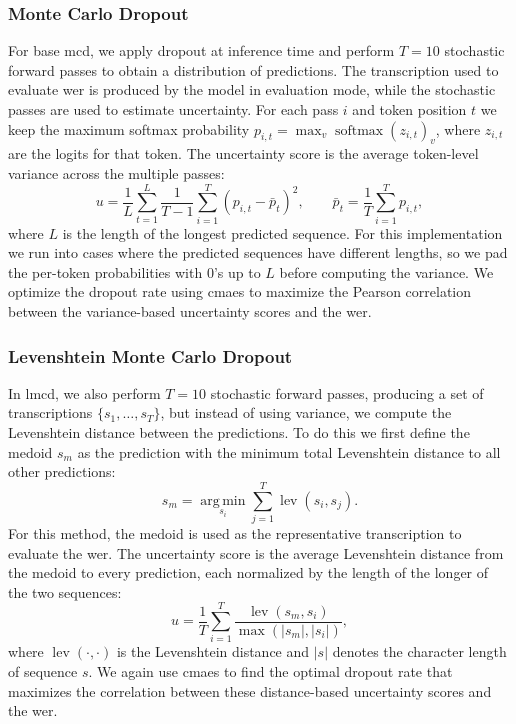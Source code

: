 \subsubsection{Monte Carlo Dropout}
For base \acrshort{mcd}, we apply dropout at inference time and perform $T = 10$ stochastic forward passes to obtain a distribution of predictions. The transcription used to evaluate \acrshort{wer} is produced by the model in evaluation mode, while the stochastic passes are used to estimate uncertainty. For each pass $i$ and token position $t$ we keep the maximum softmax probability $p_{i,t} = \max_v \operatorname{softmax}(z_{i,t})_v$, where $z_{i,t}$ are the logits for that token. The uncertainty score is the average token-level variance across the multiple passes:
\begin{equation}
	u = \frac{1}{L}\sum_{t=1}^{L} \frac{1}{T-1}\sum_{i=1}^{T}\left(p_{i,t} - \bar{p}_t\right)^2,
	\qquad \bar{p}_t = \frac{1}{T}\sum_{i=1}^{T} p_{i,t},
\end{equation}
where $L$ is the length of the longest predicted sequence.
For this implementation we run into cases where the predicted sequences have different lengths, so we pad the per-token probabilities with 0's up to $L$ before computing the variance.
We optimize the dropout rate using \acrshort{cmaes} to maximize the Pearson correlation between the variance-based uncertainty scores and the \acrshort{wer}.

\subsubsection{Levenshtein Monte Carlo Dropout}
In \acrshort{lmcd}, we also perform $T = 10$ stochastic forward passes, producing a set of transcriptions $\{s_1, \dots, s_T\}$, but instead of using variance, we compute the Levenshtein distance \cite{levenshtein1966binary} between the predictions. To do this we first define the medoid $s_m$ as the prediction with the minimum total Levenshtein distance to all other predictions:
\begin{equation}
	s_m = \operatorname*{arg\,min}_{s_i}\sum_{j=1}^{T} \operatorname{lev}(s_i, s_j).
\end{equation}
For this method, the medoid is used as the representative transcription to evaluate the \acrfull{wer}. The uncertainty score is the average Levenshtein\cite{levenshtein1966binary} distance from the medoid to every prediction, each normalized by the length of the longer of the two sequences:
\begin{equation}
	u = \frac{1}{T}\sum_{i=1}^{T} \frac{\operatorname{lev}(s_m, s_i)}{\max\left(|s_m|, |s_i|\right)},
\end{equation}
where $\operatorname{lev}(\cdot, \cdot)$ is the Levenshtein distance and $|s|$ denotes the character length of sequence $s$.
We again use \acrshort{cmaes} to find the optimal dropout rate that maximizes the correlation between these distance-based uncertainty scores and the \acrshort{wer}.

